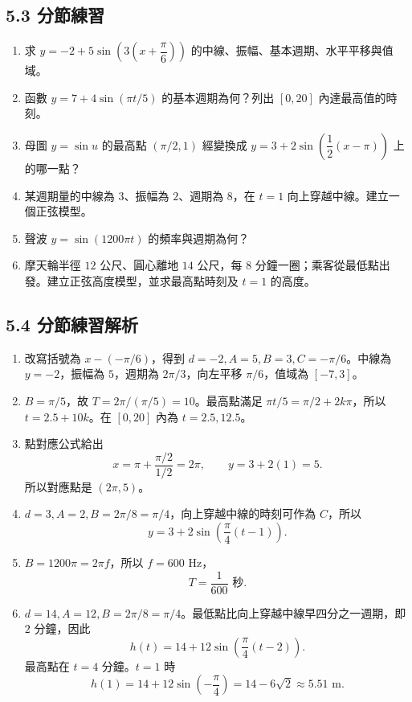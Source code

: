 \documentclass[11pt,a4paper]{article}
\providecommand{\tightlist}{%
  \setlength{\itemsep}{0pt}\setlength{\parskip}{0pt}}
\begin{document}
\subsection{5.3 分節練習}\label{ux5206ux7bc0ux7df4ux7fd2-4}

\begin{enumerate}
\def\labelenumi{\arabic{enumi}.}
\tightlist
\item
  求 \(y=-2+5\sin\left(3\left(x+\dfrac\pi6\right)\right)\) 的中線、振幅、基本週期、水平平移與值域。
\item
  函數 \(y=7+4\sin(\pi t/5)\) 的基本週期為何？列出 \([0,20]\) 內達最高值的時刻。
\item
  母圖 \(y=\sin u\) 的最高點 \((\pi/2,1)\) 經變換成 \(y=3+2\sin\left(\dfrac12(x-\pi)\right)\) 上的哪一點？
\item
  某週期量的中線為 \(3\)、振幅為 \(2\)、週期為 \(8\)，在 \(t=1\) 向上穿越中線。建立一個正弦模型。
\item
  聲波 \(y=\sin(1200\pi t)\) 的頻率與週期為何？
\item
  摩天輪半徑 \(12\) 公尺、圓心離地 \(14\) 公尺，每 \(8\) 分鐘一圈；乘客從最低點出發。建立正弦高度模型，並求最高點時刻及 \(t=1\) 的高度。
\end{enumerate}

\subsection{5.4 分節練習解析}\label{ux5206ux7bc0ux7df4ux7fd2ux89e3ux6790-4}

\begin{enumerate}
\def\labelenumi{\arabic{enumi}.}
\tightlist
\item
  改寫括號為 \(x-(-\pi/6)\)，得到 \(d=-2,A=5,B=3,C=-\pi/6\)。中線為 \(y=-2\)，振幅為 \(5\)，週期為 \(2\pi/3\)，向左平移 \(\pi/6\)，值域為 \([-7,3]\)。
\item
  \(B=\pi/5\)，故 \(T=2\pi/(\pi/5)=10\)。最高點滿足 \(\pi t/5=\pi/2+2k\pi\)，所以 \(t=2.5+10k\)。在 \([0,20]\) 內為 \(t=2.5,12.5\)。
\item
  點對應公式給出
  \[x=\pi+\frac{\pi/2}{1/2}=2\pi,\qquad y=3+2(1)=5.\]
  所以對應點是 \((2\pi,5)\)。
\item
  \(d=3,A=2,B=2\pi/8=\pi/4\)，向上穿越中線的時刻可作為 \(C\)，所以
  \[y=3+2\sin\left(\frac\pi4(t-1)\right).\]
\item
  \(B=1200\pi=2\pi f\)，所以 \(f=600\) Hz，
  \[T=\frac1{600}\text{ 秒}.\]
\item
  \(d=14,A=12,B=2\pi/8=\pi/4\)。最低點比向上穿越中線早四分之一週期，即 \(2\) 分鐘，因此
  \[h(t)=14+12\sin\left(\frac\pi4(t-2)\right).\]
  最高點在 \(t=4\) 分鐘。\(t=1\) 時
  \[h(1)=14+12\sin\left(-\frac\pi4\right)=14-6\sqrt2\approx5.51\text{ m}.\]
\end{enumerate}
\end{document}
